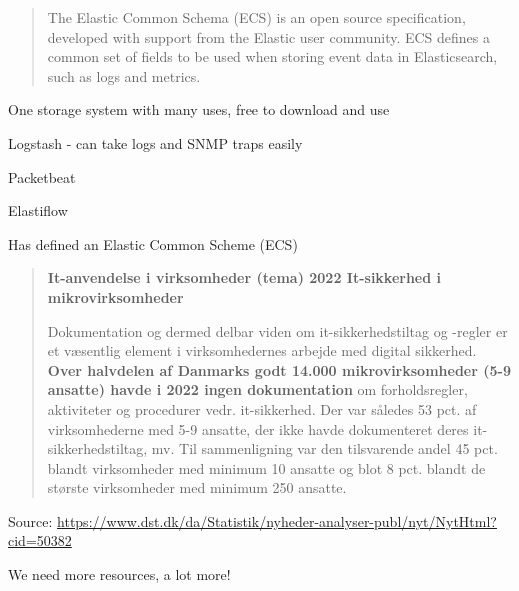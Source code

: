 \documentclass[Screen16to9,17pt]{foils}
\begin{document}


\begin{quote}
The Elastic Common Schema (ECS) is an open source specification, developed with support from the Elastic user community. ECS defines a common set of fields to be used when storing event data in Elasticsearch, such as logs and metrics.
\end{quote}

One storage system with many uses, free to download and use
\begin{list2}
\item Logstash - can take logs and SNMP traps easily
\item Packetbeat 
\item Elastiflow
\item Has defined an Elastic Common Scheme (ECS)\\
\end{list2}






\begin{quote}{\bf
It-anvendelse i virksomheder (tema) 2022 It-sikkerhed i mikrovirksomheder}

Dokumentation og dermed delbar viden om it-sikkerhedstiltag og -regler er et væsentlig element i virksomhedernes arbejde med digital sikkerhed. {\bf Over halvdelen af Danmarks godt 14.000 mikrovirksomheder (5-9 ansatte) havde i 2022 ingen dokumentation} om forholdsregler, aktiviteter og procedurer vedr. it-sikkerhed. Der var således 53 pct. af virksomhederne med 5-9 ansatte, der ikke havde dokumenteret deres it-sikkerhedstiltag, mv. Til sammenligning var den tilsvarende andel 45 pct. blandt virksomheder med minimum 10 ansatte og blot 8 pct. blandt de største virksomheder med minimum 250 ansatte.
\end{quote}
Source: \url{https://www.dst.dk/da/Statistik/nyheder-analyser-publ/nyt/NytHtml?cid=50382}

\begin{list2}
\item We need more resources, a lot more!
\end{list2}
\end{document}
